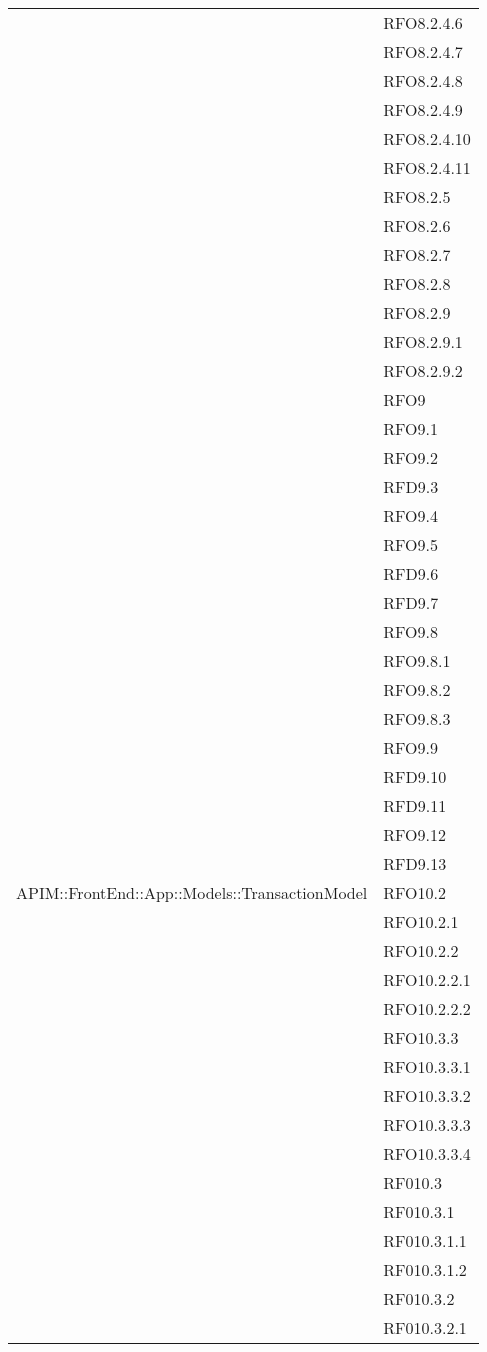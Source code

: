 \begin{longtable}{ p{12cm} | p{4cm} }
	& RFO8.2.4.6 \\
	& RFO8.2.4.7 \\
	& RFO8.2.4.8 \\
	& RFO8.2.4.9 \\
	& RFO8.2.4.10 \\
	& RFO8.2.4.11 \\
	& RFO8.2.5 \\
	& RFO8.2.6 \\
	& RFO8.2.7 \\
	& RFO8.2.8 \\
	& RFO8.2.9 \\
	& RFO8.2.9.1 \\
	& RFO8.2.9.2 \\
	& RFO9 \\
	& RFO9.1 \\
	& RFO9.2 \\
	& RFD9.3 \\
	& RFO9.4 \\
	& RFO9.5 \\
	& RFD9.6 \\
	& RFD9.7 \\
	& RFO9.8 \\
	& RFO9.8.1 \\
	& RFO9.8.2 \\
	& RFO9.8.3 \\
	& RFO9.9 \\
	& RFD9.10 \\
	& RFD9.11 \\
	& RFO9.12 \\
	& RFD9.13 \\
	\hline
	APIM::FrontEnd::App::Models::TransactionModel
	& RFO10.2 \\
	& RFO10.2.1 \\
	& RFO10.2.2 \\
	& RFO10.2.2.1 \\
	& RFO10.2.2.2 \\
	& RFO10.3.3 \\
	& RFO10.3.3.1 \\
	& RFO10.3.3.2 \\
	& RFO10.3.3.3 \\
	& RFO10.3.3.4 \\
	& RF010.3 \\
	& RF010.3.1 \\
	& RF010.3.1.1 \\
	& RF010.3.1.2 \\
	& RF010.3.2 \\
	& RF010.3.2.1 \\

\end{longtable}
